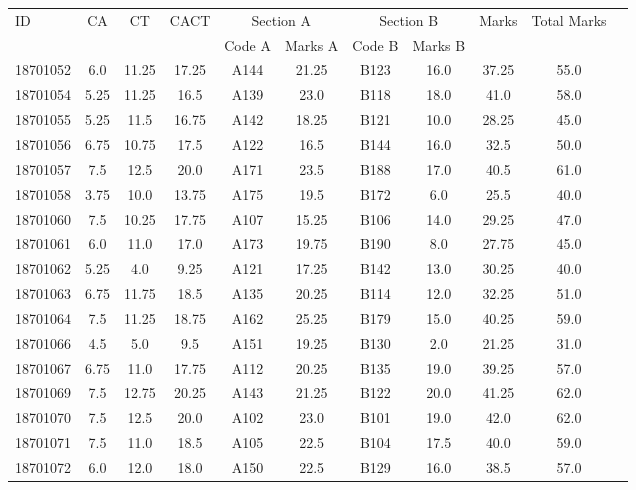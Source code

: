 \documentclass[12pt]{article}
\begin{document}
    \begin{center} 
	\renewcommand{\arraystretch}{1.08}
	\begin{small}
    \begin{tabular}{|l|c|c|c|c|c|c|c|c|c|c|} \hline
	\multirow{2}{*}{ID} & 	\multirow{2}{*}{CA}  & 	\multirow{2}{*}{CT}  & 	\multirow{2}{*}{CACT}  & \multicolumn{2 }{c|}{Section A}& \multicolumn{2 }{c|}{Section B} & 	\multirow{2}{*}{Marks}  & 	\multirow{2}{*}{Total Marks}  \\ 
	&  &  &  & Code A & Marks A & Code B & Marks B&  &  \\ \hline
18701052 & 6.0 & 11.25 & 17.25 & A144 & 21.25 & B123 & 16.0 & 37.25 & 55.0\\ \hline 
18701054 & 5.25 & 11.25 & 16.5 & A139 & 23.0 & B118 & 18.0 & 41.0 & 58.0\\ \hline 
18701055 & 5.25 & 11.5 & 16.75 & A142 & 18.25 & B121 & 10.0 & 28.25 & 45.0\\ \hline 
18701056 & 6.75 & 10.75 & 17.5 & A122 & 16.5 & B144 & 16.0 & 32.5 & 50.0\\ \hline 
18701057 & 7.5 & 12.5 & 20.0 & A171 & 23.5 & B188 & 17.0 & 40.5 & 61.0\\ \hline 
18701058 & 3.75 & 10.0 & 13.75 & A175 & 19.5 & B172 & 6.0 & 25.5 & 40.0\\ \hline 
18701060 & 7.5 & 10.25 & 17.75 & A107 & 15.25 & B106 & 14.0 & 29.25 & 47.0\\ \hline 
18701061 & 6.0 & 11.0 & 17.0 & A173 & 19.75 & B190 & 8.0 & 27.75 & 45.0\\ \hline 
18701062 & 5.25 & 4.0 & 9.25 & A121 & 17.25 & B142 & 13.0 & 30.25 & 40.0\\ \hline 
18701063 & 6.75 & 11.75 & 18.5 & A135 & 20.25 & B114 & 12.0 & 32.25 & 51.0\\ \hline 
18701064 & 7.5 & 11.25 & 18.75 & A162 & 25.25 & B179 & 15.0 & 40.25 & 59.0\\ \hline 
18701066 & 4.5 & 5.0 & 9.5 & A151 & 19.25 & B130 & 2.0 & 21.25 & 31.0\\ \hline 
18701067 & 6.75 & 11.0 & 17.75 & A112 & 20.25 & B135 & 19.0 & 39.25 & 57.0\\ \hline 
18701069 & 7.5 & 12.75 & 20.25 & A143 & 21.25 & B122 & 20.0 & 41.25 & 62.0\\ \hline 
18701070 & 7.5 & 12.5 & 20.0 & A102 & 23.0 & B101 & 19.0 & 42.0 & 62.0\\ \hline 
18701071 & 7.5 & 11.0 & 18.5 & A105 & 22.5 & B104 & 17.5 & 40.0 & 59.0\\ \hline 
18701072 & 6.0 & 12.0 & 18.0 & A150 & 22.5 & B129 & 16.0 & 38.5 & 57.0\\ \hline 

\end{tabular}
\end{small}
\end{center}
\end{document}
